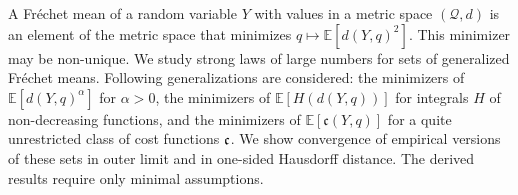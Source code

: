 A Fréchet mean of a random variable $Y$ with values in a metric space $(\mathcal Q, d)$ is an element of the metric space that minimizes $q \mapsto \mathbb E[d(Y,q)^2]$. This minimizer may be non-unique. 
We study strong laws of large numbers for sets of generalized Fréchet means.
Following generalizations are considered: 
the minimizers of $\mathbb E[d(Y, q)^\alpha]$ for $\alpha > 0$,
the minimizers of $\mathbb E[H(d(Y, q))]$ for integrals $H$ of non-decreasing functions, and
the minimizers of $\mathbb E[\mathfrak c(Y, q)]$ for a quite unrestricted class of cost functions $\mathfrak{c}$.
We show convergence of empirical versions of these sets in outer limit and in one-sided Hausdorff distance. The derived results require only minimal assumptions.
